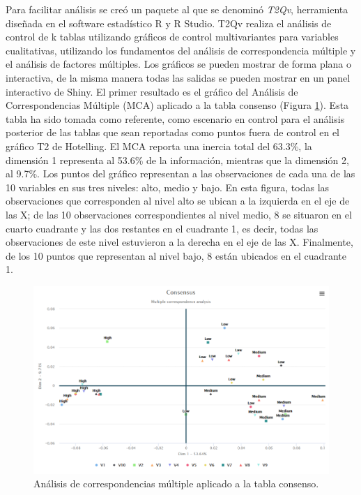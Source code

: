 \documentclass[water,article,submit,moreauthors,pdftex]{mdpi}
\begin{document}
Para facilitar análisis se creó un paquete al que se denominó
\emph{T2Qv}, herramienta diseñada en el software estadístico R y R
Studio. T2Qv realiza el análisis de control de k tablas utilizando
gráficos de control multivariantes para variables cualitativas,
utilizando los fundamentos del análisis de correspondencia múltiple y el
análisis de factores múltiples. Los gráficos se pueden mostrar de forma
plana o interactiva, de la misma manera todas las salidas se pueden
mostrar en un panel interactivo de Shiny. El primer resultado es el
gráfico del Análisis de Correspondencias Múltiple (MCA) aplicado a la
tabla consenso (Figura \ref{fig:CONS1}). Esta tabla ha sido tomada como
referente, como escenario en control para el análisis posterior de las
tablas que sean reportadas como puntos fuera de control en el gráfico T2
de Hotelling. El MCA reporta una inercia total del 63.3\%, la dimensión
1 representa al 53.6\% de la información, mientras que la dimensión 2,
al 9.7\%. Los puntos del gráfico representan a las observaciones de cada
una de las 10 variables en sus tres niveles: alto, medio y bajo. En esta
figura, todas las observaciones que corresponden al nivel alto se ubican
a la izquierda en el eje de las X; de las 10 observaciones
correspondientes al nivel medio, 8 se situaron en el cuarto cuadrante y
las dos restantes en el cuadrante 1, es decir, todas las observaciones
de este nivel estuvieron a la derecha en el eje de las X. Finalmente, de
los 10 puntos que representan al nivel bajo, 8 están ubicados en el
cuadrante 1.

\begin{figure}[!ht]



\begin{center}\includegraphics[width=0.6\linewidth,]{CONS1} \end{center}

\caption{Análisis de correspondencias múltiple aplicado a la tabla consenso.}

\label{fig:CONS1}
\end{figure}
\end{document}
